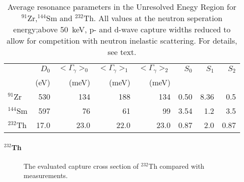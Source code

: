 \documentclass[twocolumn,amsmath,amssymb,10pt,groupedaddress,a4paper]{revtex4}
\begin{document}
\begin{table}[htbp]
\caption{Average resonance parameters in the Unresolved Enegy Region for $^{91}$Zr,$^{144}$Sm and $^{232}$Th.
All values at the neutron seperation energy;above 50~keV, p- and d-wave capture widths reduced to allow
 for competition with neutron inelastic scattering. For details, see text. }
\label{said01}
\begin{center}
\begin{tabular}{lrrrrrrr}
\hline
         & $D_0$  &   $<\Gamma_\gamma>_0$  & $<\Gamma_\gamma>_1$& $<\Gamma_\gamma>_2$ & $S_0$ &$S_1$ &$S_2$  \\
         & (eV)   &     (meV)              &     (meV)          & (meV)               &       &      &       \\
\hline
   $^{91}$Zr  &    530   &    134           &     188    &        134     &             0.50  &   8.36   & 0.5\\
  $^{144}$Sm  &597       &    76            &         61 &         99     &             3.54  &   1.2    & 3.5 \\
  $^{232}$Th  &   17.0   &   23.0           &     22.0   &       23.0     &             0.87  &   2.0    & 0.87 \\
\hline

\end{tabular}
\end{center}
\end{table}



\paragraph{$^{232}$Th}
\begin{figure}[htbp]
\caption{The evaluated capture cross section of $^{232}$Th compared with measurements.}
\label{232th}
\end{figure}
\end{document}
